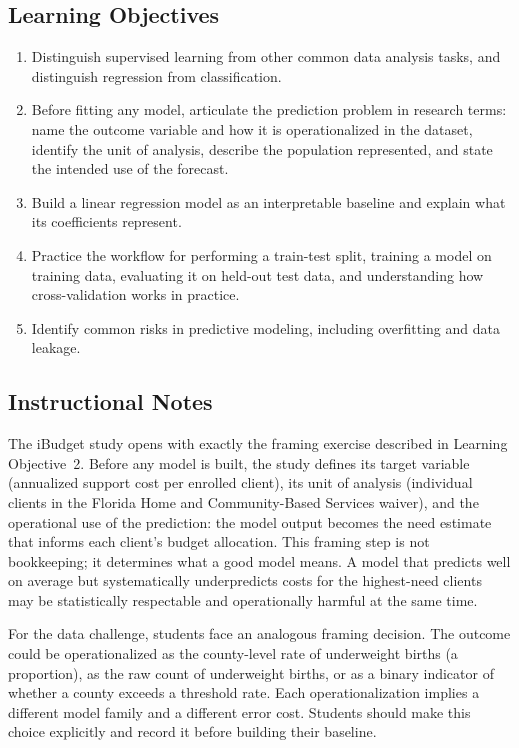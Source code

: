 \subsection{Learning Objectives}

\begin{enumerate}
    \item Distinguish supervised learning from other common data
    analysis tasks, and distinguish regression from classification.
    \item Before fitting any model, articulate the prediction problem
    in research terms: name the outcome variable and how it is
    operationalized in the dataset, identify the unit of analysis,
    describe the population represented, and state the intended use
    of the forecast.
    \item Build a linear regression model as an interpretable baseline
    and explain what its coefficients represent.
    \item Practice the workflow for performing a train-test split,
    training a model on training data, evaluating it on held-out test
    data, and understanding how cross-validation works in practice.
    \item Identify common risks in predictive modeling, including
    overfitting and data leakage.
\end{enumerate}

\subsection{Instructional Notes}

The iBudget study opens with exactly the framing exercise described
in Learning Objective~2. Before any model is built, the study
defines its target variable (annualized support cost per enrolled
client), its unit of analysis (individual clients in the Florida
Home and Community-Based Services waiver), and the operational use
of the prediction: the model output becomes the need estimate that
informs each client's budget allocation. This framing step is not
bookkeeping; it determines what a good model means. A model that
predicts well on average but systematically underpredicts costs for
the highest-need clients may be statistically respectable and
operationally harmful at the same time.

For the data challenge, students face an analogous framing decision.
The outcome could be operationalized as the county-level rate of
underweight births (a proportion), as the raw count of underweight
births, or as a binary indicator of whether a county exceeds a
threshold rate. Each operationalization implies a different model
family and a different error cost. Students should make this choice
explicitly and record it before building their baseline.

